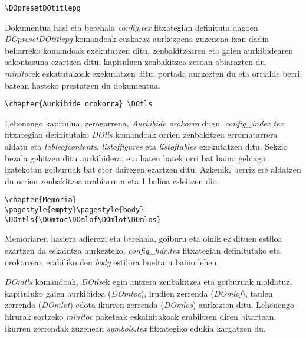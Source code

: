 \begin{verbatim}

\end{verbatim}

\begin{verbatim}
\DOpresetDOtitlepg
\end{verbatim}

Dokumentua hasi eta berehala \emph{config.tex} fitxategian definituta dagoen \emph{DOpresetDOtitlepg} komandoak euskaraz aurkezpena zuzenena izan dadin beharreko komandoak exekutatzen ditu, zenbakitzearen eta gaien aurkibidearen sakontasuna ezartzen ditu, kapituluen zenbakitzea zeroan abiarazten du, \emph{minitoc}ek eskatutakoak exekutatzen ditu, portada aurkezten du eta orrialde berri batean hasteko prestatzen du dokumentua.

\begin{verbatim}
\chapter{Aurkibide orokorra} \DOtls
\end{verbatim}

Lehenengo kapitulua, zerogarrena, \emph{Aurkibide orokorra} dugu. \emph{config\_index.tex} fitxategian definitutako \emph{DOtls} komandoak orrien zenbakitzea erromatarrera aldatu eta \emph{tableofcontents}, \emph{listoffigures} eta \emph{listoftables} exekutatzen ditu. Sekzio bezala gehitzen ditu aurkibidera, eta baten batek orri bat baino gehiago izatekotan goiburuak bat etor daitezen ezartzen ditu. Azkenik, berriz ere aldatzen du orrien zenbakitzea arabiarrera eta 1 balioa esleitzen dio.

\begin{verbatim}
\chapter{Memoria}
\pagestyle{empty}\pagestyle{body}
\DOmtls{\DOmtoc\DOmlof\DOmlot\DOmlos}
\end{verbatim}

Memoriaren hasiera adierazi eta berehala, goiburu eta oinik ez dituen estiloa ezartzen da eskaintza aurkezteko, \emph{config\_hdr.tex} fitxategian definitutako eta orokorrean erabiliko den \emph{body} estilora bueltatu baino lehen.

\emph{DOmtls} komandoak, \emph{DOtls}ek egin antzera zenbakitzea eta goiburuak moldatuz, kapituluko gaien aurkibidea (\emph{DOmtoc}), irudien zerrenda (\emph{DOmlof}), taulen zerrenda (\emph{DOmlot}) edota ikurren zerrenda (\emph{DOmlos}) aurkezten ditu. Lehenengo hirurak sortzeko \emph{minitoc} paketeak eskainitakoak erabiltzen diren bitartean, ikurren zerrendak zuzenean \emph{symbols.tex} fitxategiko edukia kargatzen du.

